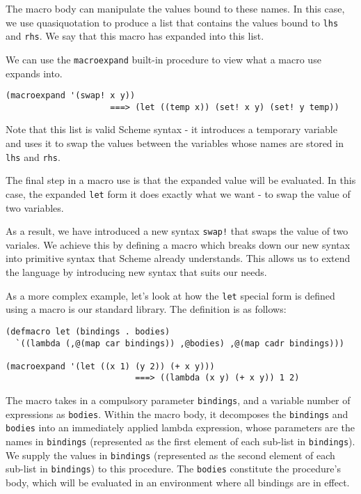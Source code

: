 \documentclass{article}
\begin{document}
The macro body can manipulate the values bound to these names. In this case, we use quasiquotation to produce a list that contains the values bound to \texttt{lhs} and \texttt{rhs}. We say that this macro has expanded into this list.

We can use the \texttt{macroexpand} built-in procedure to view what a macro use expands into.

\begin{lstlisting}
(macroexpand '(swap! x y))
                     ===> (let ((temp x)) (set! x y) (set! y temp))
\end{lstlisting}

Note that this list is valid Scheme syntax - it introduces a temporary variable and uses it to swap the values between the variables whose names are stored in \texttt{lhs} and \texttt{rhs}.

The final step in a macro use is that the expanded value will be evaluated. In this case, the expanded \texttt{let} form it does exactly what we want - to swap the value of two variables.

As a result, we have introduced a new syntax \texttt{swap!} that swaps the value of two variales. We achieve this by defining a macro which breaks down our new syntax into primitive syntax that Scheme already understands. This allows us to extend the language by introducing new syntax that suits our needs.

As a more complex example, let's look at how the \texttt{let} special form is defined using a macro is our standard library. The definition is as follows:

\begin{lstlisting}
(defmacro let (bindings . bodies)
  `((lambda (,@(map car bindings)) ,@bodies) ,@(map cadr bindings)))

(macroexpand '(let ((x 1) (y 2)) (+ x y)))
                          ===> ((lambda (x y) (+ x y)) 1 2)
\end{lstlisting}

The macro takes in a compulsory parameter \texttt{bindings}, and a variable number of expressions as \texttt{bodies}. Within the macro body, it decomposes the \texttt{bindings} and \texttt{bodies} into an immediately applied lambda expression, whose parameters are the names in \texttt{bindings} (represented as the first element of each sub-list in \texttt{bindings}). We supply the values in \texttt{bindings} (represented as the second element of each sub-list in \texttt{bindings}) to this procedure. The \texttt{bodies} constitute the procedure's body, which will be evaluated in an environment where all bindings are in effect.
\end{document}
